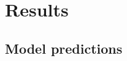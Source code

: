 \documentclass{jfm}
\begin{document}
%




\section{Results}

\subsection{Model predictions}
\end{document}
